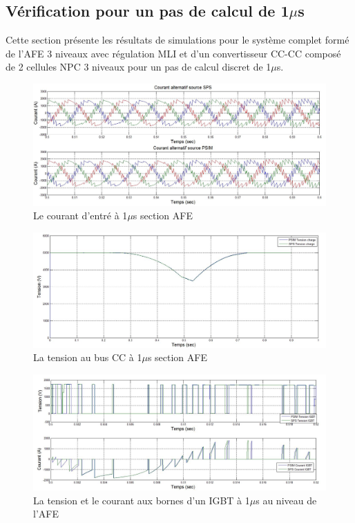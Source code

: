 \documentclass[11pt,letterpaper,final]{report}
\begin{document}
\subsection{Vérification pour un pas de calcul de 1$\mu$s}
Cette section présente les résultats de simulations pour le système complet formé de l'AFE 3 niveaux avec régulation MLI et d'un convertisseur CC-CC composé de 2 cellules NPC 3 niveaux pour un pas de calcul discret de 1$\mu$s. 

\begin{figure}[htb]
\centering
\includegraphics[scale=0.5]{Fig/DCP_AFE/1u/cour_al.jpg}
\caption{Le courant d'entré à 1$\mu$s section AFE}
\label{AF_DC_cou1}
\end{figure}


\begin{figure}[htb]
\centering
\includegraphics[scale=0.5]{Fig/DCP_AFE/1u/ten_bus.jpg}
\caption{La tension au bus CC à 1$\mu$s section AFE}
\label{AF_DC_vch1}
\end{figure}



\begin{figure}[htb]
\centering
\includegraphics[scale=0.5]{Fig/DCP_AFE/1u/IGBT_afe.jpg}
\caption{La tension et le courant aux bornes d'un IGBT à 1$\mu$s au niveau de l'AFE}
\label{AF_DC_IGBT1}
\end{figure}
\end{document}

